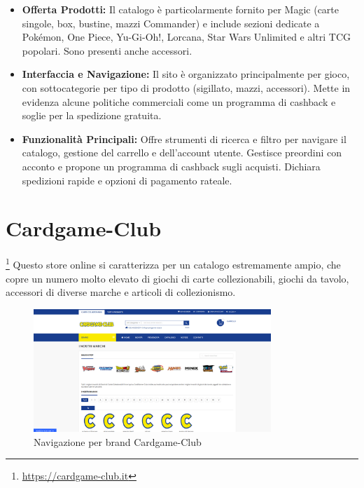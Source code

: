 \documentclass[14pt]{extreport}
\begin{document}
\begin{itemize}
    \item \textbf{Offerta Prodotti:} Il catalogo è particolarmente fornito per Magic (carte singole, box, bustine, mazzi Commander) e include sezioni dedicate a Pokémon, One Piece, Yu-Gi-Oh!, Lorcana, Star Wars Unlimited e altri TCG popolari. Sono presenti anche accessori.
    \item \textbf{Interfaccia e Navigazione:} Il sito è organizzato principalmente per gioco, con sottocategorie per tipo di prodotto (sigillato, mazzi, accessori). Mette in evidenza alcune politiche commerciali come un programma di cashback e soglie per la spedizione gratuita.
    \item \textbf{Funzionalità Principali:} Offre strumenti di ricerca e filtro per navigare il catalogo, gestione del carrello e dell'account utente. Gestisce preordini con acconto e propone un programma di cashback sugli acquisti. Dichiara spedizioni rapide e opzioni di pagamento rateale.
\end{itemize}

\section{Cardgame-Club} \footnote{\url{https://cardgame-club.it}}
Questo store online si caratterizza per un catalogo estremamente ampio, che copre un numero molto elevato di giochi di carte collezionabili, giochi da tavolo, accessori di diverse marche e articoli di collezionismo.

\begin{figure}[h!]
    \centering
    \includegraphics[width=0.8\textwidth]{cardgame.png}
    \caption{Navigazione per brand Cardgame-Club}
    \label{fig:cardgameclub}
\end{figure}
\end{document}
